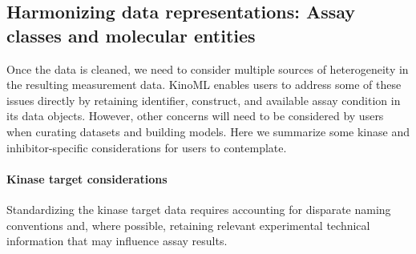 \documentclass[9pt,lessons]{livecoms}
\begin{document}
\subsection{Harmonizing data representations: Assay classes and molecular entities}

Once the data is cleaned, we need to consider multiple sources of heterogeneity in the resulting measurement data. KinoML enables users to address some of these issues directly by retaining identifier, construct, and available assay condition in its data objects. However, other concerns will need to be considered by users when curating datasets and building models. Here we summarize some kinase and inhibitor-specific considerations for users to contemplate.

\paragraph{Kinase target considerations}
Standardizing the kinase target data requires accounting for disparate naming conventions and, where possible, retaining relevant experimental technical information that may influence assay results.
\end{document}
